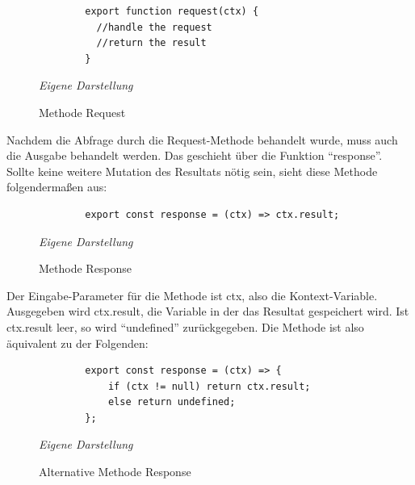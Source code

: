 		\begin{figure}[H]
		\centering
		\begin{minipage}[t]{.7\textwidth} %
		\caption{Methode Request} %
		\begin{verbatim}
		export function request(ctx) {
		  //handle the request
		  //return the result
		}
		\end{verbatim}
		
		\textit{Eigene Darstellung} %
		\label{fig:requestMethode}
		\end{minipage}
		\end{figure}
	
	Nachdem die Abfrage durch die Request-Methode behandelt wurde, muss auch die Ausgabe behandelt werden. Das geschieht über die Funktion ``response''. Sollte keine weitere Mutation des Resultats nötig sein, sieht diese Methode folgendermaßen aus:\newline
		\begin{figure}[H]
		\centering
		\begin{minipage}[t]{.7\textwidth} %
		\caption{Methode Response} %
		\begin{verbatim}
		export const response = (ctx) => ctx.result;
		\end{verbatim}
	
		\textit{Eigene Darstellung} %
		\label{fig:responseMethode}
		\end{minipage}
		\end{figure}\newpage
	Der Eingabe-Parameter für die Methode ist ctx, also die Kontext-Variable. Ausgegeben wird ctx.result, die Variable in der das Resultat gespeichert wird. Ist ctx.result leer, so wird ``undefined'' zurückgegeben. Die Methode ist also äquivalent zu der Folgenden:\newline
		\begin{figure}[H]
		\centering
		\begin{minipage}[t]{.7\textwidth} %
		\caption{Alternative Methode Response} %
		\begin{verbatim}
		export const response = (ctx) => {
		    if (ctx != null) return ctx.result;
		    else return undefined;
		};
		\end{verbatim}
	
		\textit{Eigene Darstellung} %
		\label{fig:alternativeResponseMethode}
		\end{minipage}
		\end{figure}
